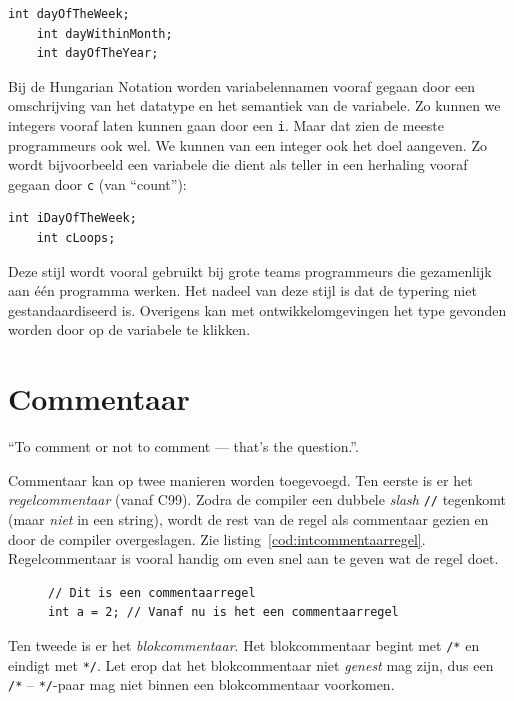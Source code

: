 \begin{lstlisting}[caption=camelCase-stijl.]
    int dayOfTheWeek;
    int dayWithinMonth;
    int dayOfTheYear;
\end{lstlisting}

Bij de Hungarian Notation worden variabelennamen vooraf gegaan door een omschrijving van het datatype en het semantiek van de variabele. Zo kunnen we integers vooraf laten kunnen gaan door een \lstinline|i|. Maar dat zien de meeste programmeurs ook wel. We kunnen van een integer ook het doel aangeven. Zo wordt bijvoorbeeld een variabele die dient als teller in een herhaling vooraf gegaan door \lstinline|c| (van ``count''):

\begin{lstlisting}[caption=Voorbeel Hungarian Notation.]
    int iDayOfTheWeek;
    int cLoops;
\end{lstlisting}

Deze stijl wordt vooral gebruikt bij grote teams programmeurs die gezamenlijk aan één programma werken. Het nadeel van deze stijl is dat de typering niet gestandaardiseerd is. Overigens kan met ontwikkelomgevingen het type gevonden worden door op de variabele te klikken.


\section{Commentaar}
``To comment or not to comment --- that's the question.''.

Commentaar kan op twee manieren worden toegevoegd. Ten eerste is er het \textsl{regelcommentaar} (vanaf C99). Zodra de compiler een dubbele \textsl{slash} \lstinline|//| tegenkomt (maar \textsl{niet} in een string), wordt de rest van de regel als commentaar gezien en door de compiler overgeslagen. Zie listing~\ref{cod:intcommentaarregel}. Regelcommentaar is vooral handig om even snel aan te geven wat de regel doet.

\begin{figure}[!ht]
\begin{lstlisting}[caption=Voorbeeld van commentaarregels.,label=cod:intcommentaarregel]
// Dit is een commentaarregel
int a = 2; // Vanaf nu is het een commentaarregel
\end{lstlisting}
\end{figure}

Ten tweede is er het \textsl{blokcommentaar}. Het blokcommentaar begint met \lstinline|/*| en eindigt met \lstinline|*/|. Let erop dat het blokcommentaar niet \textsl{genest} mag zijn, dus een \lstinline|/*| -- \lstinline|*/|-paar mag niet binnen een blokcommentaar voorkomen.

